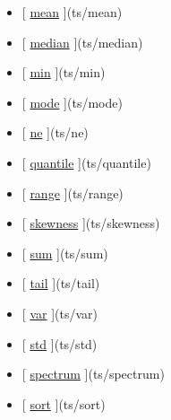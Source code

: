 \documentclass[letterpaper,10pt,english]{sphinxmanual}
\begin{document}
\begin{itemize}
\item {} 
{[} {\hyperref[classes/time_series/@ts/ts:mean]{mean}} {]}(ts/mean)

\item {} 
{[} {\hyperref[classes/time_series/@ts/ts:median]{median}} {]}(ts/median)

\item {} 
{[} {\hyperref[classes/time_series/@ts/ts:min]{min}} {]}(ts/min)

\item {} 
{[} {\hyperref[classes/time_series/@ts/ts:mode]{mode}} {]}(ts/mode)

\item {} 
{[} {\hyperref[classes/time_series/@ts/ts:ne]{ne}} {]}(ts/ne)

\item {} 
{[} {\hyperref[classes/time_series/@ts/ts:quantile]{quantile}} {]}(ts/quantile)

\item {} 
{[} {\hyperref[classes/time_series/@ts/ts:range]{range}} {]}(ts/range)

\item {} 
{[} {\hyperref[classes/time_series/@ts/ts:skewness]{skewness}} {]}(ts/skewness)

\item {} 
{[} {\hyperref[classes/time_series/@ts/ts:sum]{sum}} {]}(ts/sum)

\item {} 
{[} {\hyperref[classes/time_series/@ts/ts:tail]{tail}} {]}(ts/tail)

\item {} 
{[} {\hyperref[classes/time_series/@ts/ts:var]{var}} {]}(ts/var)

\item {} 
{[} {\hyperref[classes/time_series/@ts/ts:std]{std}} {]}(ts/std)

\item {} 
{[} {\hyperref[classes/time_series/@ts/ts:spectrum]{spectrum}} {]}(ts/spectrum)

\item {} 
{[} {\hyperref[classes/time_series/@ts/ts:sort]{sort}} {]}(ts/sort)

\end{itemize}
\end{document}
